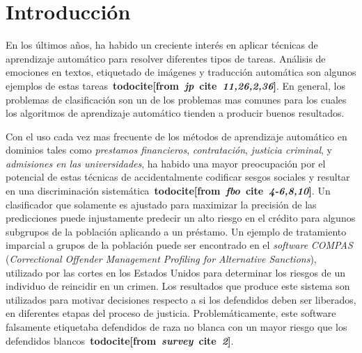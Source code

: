 \chapter*{Introducción}\label{chapter:introduction}

\newcommand{\todocite}[2]{\textbf{todocite[from~\textit{#1}~cite~\textit{#2}]}}



En los últimos años, ha habido un creciente interés en aplicar técnicas de aprendizaje automático para resolver diferentes tipos de tareas.
Análisis de emociones en textos, etiquetado de imágenes y traducción automática son algunos ejemplos de estas tareas~\todocite{jp}{11,26,2,36}.
En general, los problemas de clasificación son un de los problemas mas comunes para los cuales los algoritmos de aprendizaje automático tienden a producir buenos resultados.


Con el uso cada vez mas frecuente de los métodos de aprendizaje automático en dominios tales como \emph{prestamos financieros}, \emph{contratación}, \emph{justicia criminal}, y \emph{admisiones en las universidades}, ha habido una mayor preocupación por el potencial de estas técnicas de accidentalmente codificar sesgos sociales y resultar en una discriminación sistemática~\todocite{fbo}{4-6,8,10}.
Un clasificador que solamente es ajustado para maximizar la precisión de las predicciones puede injustamente predecir un alto riesgo en el crédito para algunos subgrupos de la población aplicando a un préstamo.
Un ejemplo de tratamiento imparcial a grupos de la población puede ser encontrado en el \emph{software} \emph{COMPAS} (\emph{Correctional Offender Management Profiling for Alternative Sanctions}), utilizado por las cortes en los Estados Unidos para determinar los riesgos de un individuo de reincidir en un crimen.
Los resultados que produce este sistema son utilizados para motivar decisiones respecto a si los defendidos deben ser liberados, en diferentes etapas del proceso de justicia.
Problemáticamente, este software falsamente etiquetaba defendidos de raza no blanca con un mayor riesgo que los defendidos blancos~\todocite{survey}{2}.


